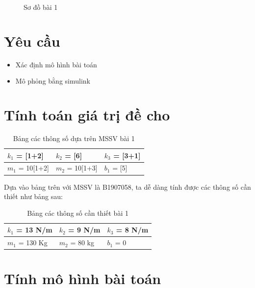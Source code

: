 \documentclass{standalone}
\begin{document}
	
	\begin{figure}[!htp]
		\begin{center}
			
		\end{center}
		\caption{Sơ đồ bài 1}
		\label{b1-diagram}
	\end{figure}
	
	\section{Yêu cầu}%
	\begin{itemize}
		\item Xác định mô hình bài toán
		\item Mô phỏng bằng simulink
	\end{itemize}
	
	\section{Tính toán giá trị đề cho}%
	\pagebreak
	\begin{table}[!htp]
		\centering
		\begin{tabular}{|l|l|l|}
			\hline $k_1$ = [1+2] & $k_2$ = [6] & $k_3$ = [3+1]\\
			\hline $m_1$ = 10[1+2] & $m_2$ = 10[1+3] & $b_1$ = [5]\\
			\hline
		\end{tabular}
		\caption{Bảng các thông số dựa trên MSSV bài 1}
		\label{b1-para-table}
	\end{table}
	Dựa vào bảng trên với MSSV là B1907058, ta dễ dàng tính được các thông số cần thiết như bảng sau:\\
	\begin{table}[!htp]
		\centering
		\begin{tabular}{|l|l|l|}
			\hline $k_1$ = 13 N/m & $k_2$ = 9 N/m & $k_3$ = 8 N/m\\
			\hline $m_1$ = 130 Kg & $m_2$ = 80 kg & $b_1$ = 0\\
			\hline
		\end{tabular}
		\caption{Bảng các thông số cần thiết bài 1}
		\label{b1-value-table}
	\end{table}
	
	\section{Tính mô hình bài toán}
	
\end{document}
